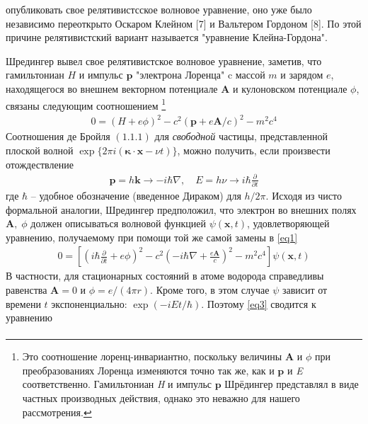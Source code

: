 \documentclass[a4paper,14pt]{article}
\theoremstyle{plain} %
\theoremstyle{definition} %
\theoremstyle{remark} %
\begin{document}
\newcommand{\un}{\underline}
\newcommand{\ve}{\vec}

\small{ опубликовать свое релятивистсское волновое уравнение, оно уже было независимо переоткрыто Оскаром Клейном [7] и Вальтером Гордоном [8]. По этой причине релятивистский вариант называется "уравнение Клейна-Гордона".

Шредингер вывел свое релятивистское волновое уравнение, заметив, что гамильтониан $H$ и импульс $\mathbf{p}$ "электрона Лоренца" c массой $m$ и зарядом $e$, находящегося во внешнем векторном потенциале $\mathbf{A}$ и кулоновском потенциале $\phi$, связаны следующим соотношением \footnote[1]{Это соотношение лоренц-инвариантно, поскольку величины $\mathbf{A}$ и $\phi$ при преобразованиях Лоренца изменяются точно так же, как и $\mathbf{p}$ и \textit{E} соответственно. Гамильтониан \textit{H} и импульс $\mathbf{p}$ Шрёдингер представлял в виде частных производных действия, однако это неважно для нашего рассмотрения.}
\begin{align}\label{eq1}
0=(H+e\phi)^{2}-c^{2}(\mathbf{p}+e \mathbf{A} / c)^{2}-m^{2} c^{4}
\end{align}
Соотношения де Бройля $(1. 1.1)$ для \textit{свободной} частицы, представленной плоской волной $\exp \{2 \pi i(\boldsymbol{\kappa} \cdot \mathbf{x}-\nu t)\}$, можно получить, если произвести отождествление
\begin{align}\label{eq2}
\mathbf{p}=h \mathbf{k} \rightarrow-i \hbar \nabla, \quad E=h \nu \rightarrow i \hbar \frac{\partial}{\partial t}
\end{align}
где $\hbar$ -- удобное обозначение (введенное Дираком) для $h / 2 \pi .$ Исходя из чисто формальной аналогии, Шредингер предположил, что электрон во внешних полях $\mathbf{A}, \;\phi$ должен описываться волновой функцией $\psi(\mathbf{x}, t)$, удовлетворяющей уравнению, получаемому при помощи той же самой замены в \ref{eq1}
\begin{align}\label{eq3}
0=\left[\left(i \hbar \frac{\partial}{\partial t}+e \phi\right)^{2}-c^{2}\left(-i \hbar \nabla+\frac{e \mathbf{A}}{c}\right)^{2}-m^{2} c^{4}\right] \psi(\mathbf{x}, t)
\end{align}
В частности, для стационарных состояний в атоме водорода справедливы равенства $\mathbf{A}=0$ и $\phi=e /(4 \pi r) .$ Кроме того, в этом случае $\psi$ зависит от времени $t$ экспоненциально: $\exp (-i E t / \hbar) .$ Поэтому \ref{eq3} сводится к уравнению
\begin{align}\label{eq4}

\end{align}}
\end{document}
